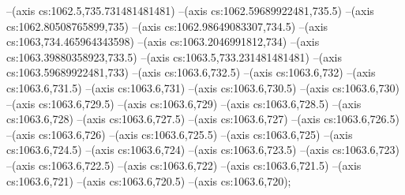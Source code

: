--(axis cs:1062.5,735.731481481481)
--(axis cs:1062.59689922481,735.5)
--(axis cs:1062.80508765899,735)
--(axis cs:1062.98649083307,734.5)
--(axis cs:1063,734.465964343598)
--(axis cs:1063.2046991812,734)
--(axis cs:1063.39880358923,733.5)
--(axis cs:1063.5,733.231481481481)
--(axis cs:1063.59689922481,733)
--(axis cs:1063.6,732.5)
--(axis cs:1063.6,732)
--(axis cs:1063.6,731.5)
--(axis cs:1063.6,731)
--(axis cs:1063.6,730.5)
--(axis cs:1063.6,730)
--(axis cs:1063.6,729.5)
--(axis cs:1063.6,729)
--(axis cs:1063.6,728.5)
--(axis cs:1063.6,728)
--(axis cs:1063.6,727.5)
--(axis cs:1063.6,727)
--(axis cs:1063.6,726.5)
--(axis cs:1063.6,726)
--(axis cs:1063.6,725.5)
--(axis cs:1063.6,725)
--(axis cs:1063.6,724.5)
--(axis cs:1063.6,724)
--(axis cs:1063.6,723.5)
--(axis cs:1063.6,723)
--(axis cs:1063.6,722.5)
--(axis cs:1063.6,722)
--(axis cs:1063.6,721.5)
--(axis cs:1063.6,721)
--(axis cs:1063.6,720.5)
--(axis cs:1063.6,720);

